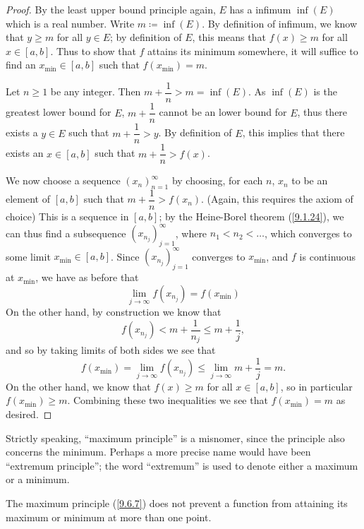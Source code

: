 \begin{proof}
  By the least upper bound principle again, \(E\) has a infimum \(\inf(E)\) which is a real number.
  Write \(m \coloneqq \inf(E)\).
  By definition of infimum, we know that \(y \geq m\) for all \(y \in E\);
  by definition of \(E\), this means that \(f(x) \geq m\) for all \(x \in [a, b]\).
  Thus to show that \(f\) attains its minimum somewhere, it will suffice to find an \(x_{\min} \in [a, b]\) such that \(f(x_{\min}) = m\).

  Let \(n \geq 1\) be any integer.
  Then \(m + \dfrac{1}{n} > m = \inf(E)\).
  As \(\inf(E)\) is the greatest lower bound for \(E\), \(m + \dfrac{1}{n}\) cannot be an lower bound for \(E\), thus there exists a \(y \in E\) such that \(m + \dfrac{1}{n} > y\).
  By definition of \(E\), this implies that there exists an \(x \in [a, b]\) such that \(m + \dfrac{1}{n} > f(x)\).

  We now choose a sequence \((x_n)_{n = 1}^\infty\) by choosing, for each \(n\), \(x_n\) to be an element of \([a, b]\) such that \(m + \dfrac{1}{n} > f(x_n)\).
  (Again, this requires the axiom of choice)
  This is a sequence in \([a, b]\);
  by the Heine-Borel theorem (\cref{9.1.24}), we can thus find a subsequence \((x_{n_j})_{j = 1}^\infty\), where \(n_1 < n_2 < \dots\), which converges to some limit \(x_{\min} \in [a, b]\).
  Since \((x_{n_j})_{j = 1}^\infty\) converges to \(x_{\min}\), and \(f\) is continuous at \(x_{\min}\), we have as before that
  \[
    \lim_{j \to \infty} f(x_{n_j}) = f(x_{\min})
  \]
  On the other hand, by construction we know that
  \[
    f(x_{n_j}) < m + \dfrac{1}{n_j} \leq m + \dfrac{1}{j},
  \]
  and so by taking limits of both sides we see that
  \[
    f(x_{\min}) = \lim_{j \to \infty} f(x_{n_j}) \leq \lim_{j \to \infty} m + \dfrac{1}{j} = m.
  \]
  On the other hand, we know that \(f(x) \geq m\) for all \(x \in [a, b]\), so in particular \(f(x_{\min}) \geq m\).
  Combining these two inequalities we see that \(f(x_{\min}) = m\) as desired.
\end{proof}

\begin{rmk}\label{9.6.8}
  Strictly speaking, ``maximum principle'' is a misnomer, since the principle also concerns the minimum.
  Perhaps a more precise name would have been ``extremum principle'';
  the word ``extremum'' is used to denote either a maximum or a minimum.
\end{rmk}

\begin{note}
  The maximum principle (\cref{9.6.7}) does not prevent a function from attaining its maximum or minimum at more than one point.
\end{note}

